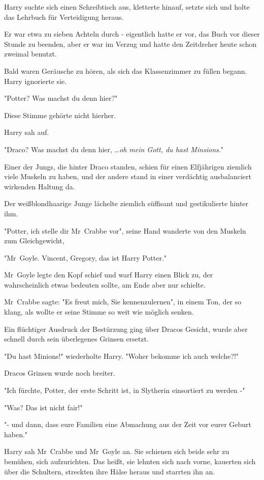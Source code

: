 {Harry suchte sich einen Schreibtisch aus, kletterte hinauf, setzte sich und holte das Lehrbuch für Verteidigung heraus.

Er war etwa zu sieben Achteln durch - eigentlich hatte er vor, das Buch vor dieser Stunde zu beenden, aber er war im Verzug und hatte den Zeitdreher heute schon zweimal benutzt.

Bald waren Geräusche zu hören, als sich das Klassenzimmer zu füllen begann. Harry ignorierte sie.

"Potter? Was machst du denn hier?"

Diese Stimme gehörte nicht hierher.

Harry sah auf.

"Draco? Was machst du denn hier, …\emph{oh mein Gott, du hast Minsions}."

Einer der Jungs, die hinter Draco standen, schien für einen Elfjährigen ziemlich viele Muskeln zu haben, und der andere stand in einer verdächtig ausbalanciert wirkenden Haltung da.

Der weißblondhaarige Junge lächelte ziemlich süffisant und gestikulierte hinter ihm.

"Potter, ich stelle dir Mr~Crabbe vor", seine Hand wanderte von den Muskeln zum Gleichgewicht,

"Mr~Goyle. Vincent, Gregory, das ist Harry Potter."

Mr~Goyle legte den Kopf schief und warf Harry einen Blick zu, der wahrscheinlich etwas bedeuten sollte, am Ende aber nur schielte.

Mr~Crabbe sagte: "Es freut mich, Sie kennenzulernen", in einem Ton, der so klang, als wollte er seine Stimme so weit wie möglich senken.

Ein flüchtiger Ausdruck der Bestürzung ging über Dracos Gesicht, wurde aber schnell durch sein überlegenes Grinsen ersetzt.

"Du hast Minions!" wiederholte Harry. "Woher bekomme ich auch welche?!"

Dracos Grinsen wurde noch breiter.

"Ich fürchte, Potter, der erste Schritt ist, in Slytherin einsortiert zu werden -"

"Was? Das ist nicht fair!"

"- und dann, dass eure Familien eine Abmachung aus der Zeit vor eurer Geburt haben."

Harry sah Mr~Crabbe und Mr~Goyle an. Sie schienen sich beide sehr zu bemühen, sich aufzurichten. Das heißt, sie lehnten sich nach vorne, kauerten sich über die Schultern, streckten ihre Hälse heraus und starrten ihn an.

}
